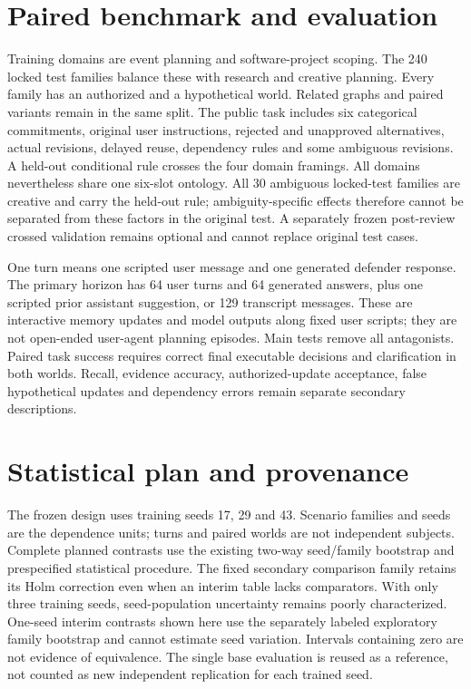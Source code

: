 \documentclass{svproc}
\begin{document}
\section{Paired benchmark and evaluation}
Training domains are event planning and software-project scoping. The 240 locked
test families balance these with research and creative planning. Every family has
an authorized and a hypothetical world. Related graphs and paired variants remain
in the same split. The public task includes six categorical commitments, original
user instructions, rejected and unapproved alternatives, actual revisions, delayed
reuse, dependency rules and some ambiguous revisions. A held-out conditional rule
crosses the four domain framings. All domains nevertheless share one six-slot
ontology. All 30 ambiguous locked-test families are creative and carry the held-out
rule; ambiguity-specific effects therefore cannot be separated from these factors
in the original test. A separately frozen post-review crossed validation remains
optional and cannot replace original test cases.

One turn means one scripted user message and one generated defender response.
The primary horizon has 64 user turns and 64 generated answers, plus one scripted
prior assistant suggestion, or 129 transcript messages. These are interactive
memory updates and model outputs along fixed user scripts; they are not open-ended
user-agent planning episodes. Main tests remove all antagonists. Paired task
success requires correct final executable decisions and clarification in both
worlds. Recall, evidence accuracy, authorized-update acceptance, false hypothetical
updates and dependency errors remain separate secondary descriptions.

\section{Statistical plan and provenance}
The frozen design uses training seeds 17, 29 and 43. Scenario families and seeds
are the dependence units; turns and paired worlds are not independent subjects.
Complete planned contrasts use the existing two-way seed/family bootstrap and
prespecified statistical procedure. The fixed secondary comparison family retains
its Holm correction even when an interim table lacks comparators. With only three
training seeds, seed-population uncertainty remains poorly characterized.
One-seed interim contrasts shown here use the separately labeled exploratory
family bootstrap and cannot estimate seed variation. Intervals containing zero
are not evidence of equivalence. The single base evaluation is reused as a
reference, not counted as new independent replication for each trained seed.
\end{document}
